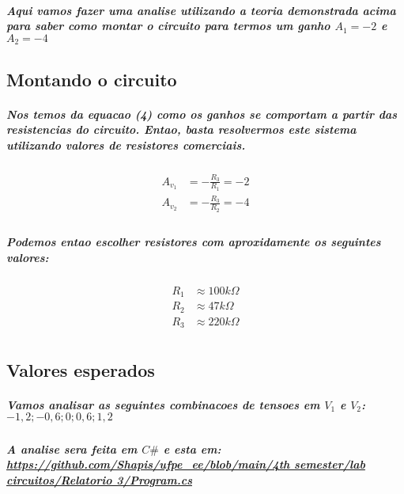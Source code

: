 \documentclass[12pt,twoside, a4paper, twocolumn]{article}
\begin{document}
\subparagraph*{Aqui vamos fazer uma analise utilizando a teoria demonstrada acima para saber como montar o circuito para termos um ganho $A_1 = -2$ e $A_2 = -4$}
\subsection{Montando o circuito}
\subparagraph*{Nos temos da equacao (4) como os ganhos se comportam a partir das resistencias do circuito. Entao, basta resolvermos este sistema utilizando valores de resistores comerciais.}



\begin{equation}
    \begin{aligned}
        A_{v_1} & = -\frac{R_3}{R_1} = -2 \\
        A_{v_2} & = -\frac{R_3}{R_2} = -4 \\
    \end{aligned}
\end{equation}

\subparagraph*{Podemos entao escolher resistores com aproxidamente os seguintes valores:}

\begin{equation}
    \begin{aligned}
        R_1 & \approx 100k \varOmega \\
        R_2 & \approx 47k \varOmega  \\
        R_3 & \approx 220k \varOmega \\
    \end{aligned}
\end{equation}

\subsection{Valores esperados}

\subparagraph*{Vamos analisar as seguintes combinacoes de tensoes em $V_1$ e $V_2$: ${-1,2 ; -0,6 ; 0 ; 0,6 ; 1,2}$}

\subparagraph*{A analise sera feita em $C\#$ e esta em: \url{https://github.com/Shapis/ufpe_ee/blob/main/4th semester/lab circuitos/Relatorio 3/Program.cs}}
\end{document}
